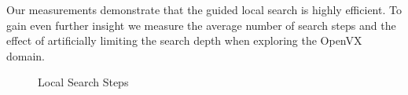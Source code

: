 \endgroup




Our measurements demonstrate that the guided local search is highly efficient. To gain even further insight we measure
the average number of search steps and the effect of artificially limiting the search depth when exploring the OpenVX domain.
\begin{figure}[h]
	\centering
		\hfill
	\caption{Local Search Steps}
	\label{fig:step}
\end{figure}



